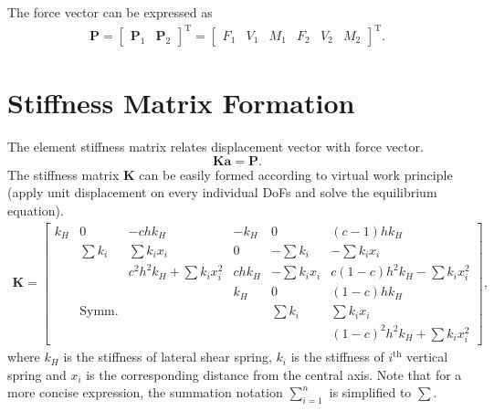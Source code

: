 \documentclass[3p]{elsarticle}
\newcommand*{\mT}{\mathrm{T}}
\begin{document}
The force vector can be expressed as
\begin{gather}
\mathbold{P}=\left[\begin{array}{cc}
	\mathbold{P}_1 & \mathbold{P}_2
\end{array}\right]^\mT=
\left[\begin{array}{cccccc}
	F_1 & V_1 & M_1 & F_2 & V_2 & M_2
\end{array}\right]^\mT.
\end{gather}
\section{Stiffness Matrix Formation}
The element stiffness matrix relates displacement vector with force vector.
\begin{equation}\label{A21}
\mathbf{K}\mathbold{a}=\mathbold{P}.
\end{equation}
The stiffness matrix $\mathbf{K}$ can be easily formed according to virtual work principle (apply unit displacement on every individual DoFs and solve the equilibrium equation).
\begin{gather}
\mathbf{K}=\left[\begin{array}{cccccc}
	k_H &      0       &          -chk_H          & -k_H  &       0       &          (c-1)hk_H           \\
	    &  \sum{}k_i   &       \sum{}k_ix_i       &   0   &  -\sum{}k_i   &        -\sum{}k_ix_i         \\
	    &              & c^2h^2k_H+\sum{}k_ix_i^2 & chk_H & -\sum{}k_ix_i & c(1-c)h^2k_H-\sum{}k_ix_i^2  \\
	    &              &                          &  k_H  &       0       &          (1-c)hk_H           \\
	    & \text{Symm.} &                          &       &   \sum{}k_i   &         \sum{}k_ix_i         \\
	    &              &                          &       &               & (1-c)^2h^2k_H+\sum{}k_ix_i^2
\end{array}\right],\label{MVLEMK}
\end{gather}
where $k_H$ is the stiffness of lateral shear spring, $k_i$ is the stiffness of $i^{\mathrm{th}}$ vertical spring and $x_i$ is the corresponding distance from the central axis. Note that for a more concise expression, the summation notation $\sum\limits_{i=1}^{n}$ is simplified to $\sum$.
\end{document}
